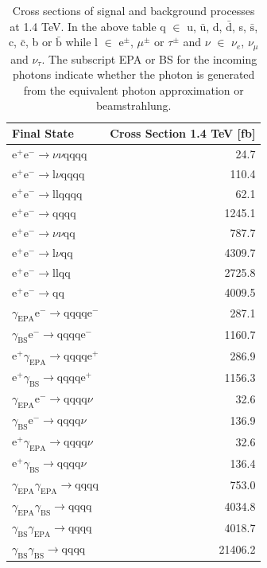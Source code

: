 \begin{table}[h!]
\centering
\begin{tabular}{ l r }
\hline
Final State & Cross Section 1.4 TeV [fb] \\ 
\hline
$\text{e}^{+}\text{e}^{-} \rightarrow \nu{\nu}\text{qqqq}$ & 24.7 \\
$\text{e}^{+}\text{e}^{-} \rightarrow \text{l}\nu\text{qqqq}$ & 110.4\\
$\text{e}^{+}\text{e}^{-} \rightarrow \text{llqqqq}$ & 62.1\\
$\text{e}^{+}\text{e}^{-} \rightarrow \text{qqqq}$ & 1245.1\\
$\text{e}^{+}\text{e}^{-} \rightarrow \nu{\nu}\text{qq}$ & 787.7\\
$\text{e}^{+}\text{e}^{-} \rightarrow \text{l}\nu\text{qq}$ & 4309.7\\
$\text{e}^{+}\text{e}^{-} \rightarrow \text{llqq}$ & 2725.8\\
$\text{e}^{+}\text{e}^{-} \rightarrow \text{qq}$ & 4009.5\\
$\gamma_{\text{EPA}}\text{e}^{-} \rightarrow \text{qqqq}\text{e}^{-}$ & 287.1\\
$\gamma_{\text{BS}}\text{e}^{-} \rightarrow \text{qqqq}\text{e}^{-}$ & 1160.7\\
$\text{e}^{+}\gamma_{\text{EPA}} \rightarrow \text{qqqq}\text{e}^{+}$ & 286.9\\
$\text{e}^{+}\gamma_{\text{BS}} \rightarrow \text{qqqq}\text{e}^{+}$ & 1156.3\\
$\gamma_{\text{EPA}}\text{e}^{-} \rightarrow \text{qqqq}\nu$ & 32.6\\
$\gamma_{\text{BS}}\text{e}^{-} \rightarrow \text{qqqq}\nu$ & 136.9\\
$\text{e}^{+}\gamma_{\text{EPA}} \rightarrow \text{qqqq}\nu$ & 32.6\\
$\text{e}^{+}\gamma_{\text{BS}} \rightarrow \text{qqqq}\nu$ & 136.4\\
$\gamma_{\text{EPA}}\gamma_{\text{EPA}} \rightarrow \text{qqqq}$ & 753.0\\
$\gamma_{\text{EPA}}\gamma_{\text{BS}} \rightarrow \text{qqqq}$ & 4034.8\\
$\gamma_{\text{BS}}\gamma_{\text{EPA}} \rightarrow \text{qqqq}$ & 4018.7\\
$\gamma_{\text{BS}}\gamma_{\text{BS}} \rightarrow \text{qqqq}$ & 21406.2\\
\hline
\end{tabular}
\caption[]{Cross sections of signal and background processes at 1.4 TeV. In the above table q $\in$ u, $\bar{\text{u}}$, d, $\bar{\text{d}}$, s, $\bar{\text{s}}$, c, $\bar{\text{c}}$, b or $\bar{\text{b}}$ while l $\in$ $\text{e}^{\pm}$, $\mu^{\pm}$ or $\tau^{\pm}$ and $\nu$ $\in$ $\nu_{e}$, $\nu_{\mu}$ and $\nu_{\tau}$.  The subscript EPA or BS for the incoming photons indicate whether the photon is generated from the equivalent photon approximation or beamstrahlung.}
\label{table:crosssectionfull}
\end{table}

